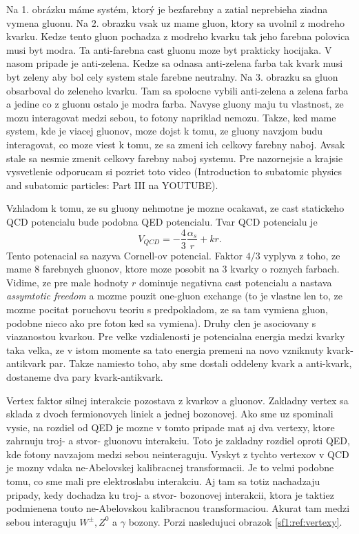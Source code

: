 \documentclass[../../main.tex]{subfiles}
\begin{document}
Na 1. obrázku máme systém, ktorý je bezfarebny a zatial neprebieha ziadna vymena gluonu. Na 2. obrazku vsak uz mame gluon, ktory sa uvolnil z modreho kvarku. Kedze tento gluon pochadza z modreho kvarku tak jeho farebna polovica musi byt modra. Ta anti-farebna cast gluonu moze byt prakticky hocijaka. V nasom pripade je anti-zelena. Kedze sa odnasa anti-zelena farba tak kvark musi byt zeleny aby bol cely system stale farebne neutralny. Na 3. obrazku sa gluon obsarboval do zeleneho kvarku. Tam sa spolocne vybili anti-zelena a zelena farba a jedine co z gluonu ostalo je modra farba. Navyse gluony maju tu vlastnost, ze mozu interagovat medzi sebou, to fotony napriklad nemozu. Takze, ked mame system, kde je viacej gluonov, moze dojst k tomu, ze gluony navzjom budu interagovat, co moze viest k tomu, ze sa zmeni ich celkovy farebny naboj. Avsak stale sa nesmie zmenit celkovy farebny naboj systemu. Pre nazornejsie a krajsie vysvetlenie odporucam si pozriet toto video (Introduction to subatomic physics and subatomic particles: Part III na YOUTUBE).\par
Vzhladom k tomu, ze su gluony nehmotne je mozne ocakavat, ze cast statickeho QCD potencialu bude podobna QED potencialu. Tvar QCD potencialu je 
$$
V_{QCD}=-\frac{4}{3}\frac{\alpha_s}{r}+kr.
$$ 
Tento potenacial sa nazyva Cornell-ov potencial. Faktor $4/3$ vyplyva z toho, ze mame 8 farebnych gluonov, ktore moze posobit na 3 kvarky o roznych farbach. Vidime, ze pre male hodnoty $r$ dominuje negativna cast potencialu a nastava \textit{assymtotic freedom} a mozme pouzit one-gluon exchange (to je vlastne len to, ze mozme pocitat poruchovu teoriu s predpokladom, ze sa tam vymiena gluon, podobne nieco ako pre foton ked sa vymiena). Druhy clen je asociovany s viazanostou kvarkou. Pre velke vzdialenosti je potencialna energia medzi kvarky taka velka, ze v istom momente sa tato energia premeni na novo vzniknuty kvark-antikvark par. Takze namiesto toho, aby sme dostali oddeleny kvark a anti-kvark, dostaneme dva pary kvark-antikvark.\par
Vertex faktor silnej interakcie pozostava z kvarkov a gluonov. Zakladny vertex sa sklada z dvoch fermionovych liniek a jednej bozonovej. Ako sme uz spominali vysie, na rozdiel od QED je mozne v tomto pripade mat aj dva vertexy, ktore zahrnuju troj- a stvor- gluonovu interakciu. Toto je zakladny rozdiel oproti QED, kde fotony navzajom medzi sebou neinteraguju. Vyskyt z tychto vertexov v QCD je mozny vdaka ne-Abelovskej kalibracnej transformacii. Je to velmi podobne tomu, co sme mali pre elektroslabu interakciu. Aj tam sa totiz nachadzaju pripady, kedy dochadza ku troj- a stvor- bozonovej interakcii, ktora je taktiez podmienena touto ne-Abelovskou kalibracnou transformaciou. Akurat tam medzi sebou interaguju $W^{\pm}, Z^0$ a $ \gamma$ bozony. Porzi nasledujuci obrazok \ref{sf1:ref:vertexy}.
\end{document}
